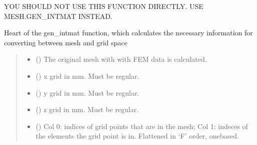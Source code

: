 \documentclass[letterpaper,10pt,english]{sphinxmanual}
\begin{document}
\begin{fulllineitems}
\label{\detokenize{_autosummary/nirfasterff.utils.gen_intmat_impl:nirfasterff.utils.gen_intmat_impl}}
\pysigstartsignatures
{}
\pysigstopsignatures
\sphinxAtStartPar
YOU SHOULD NOT USE THIS FUNCTION DIRECTLY. USE MESH.GEN\_INTMAT INSTEAD.

\sphinxAtStartPar
Heart of the gen\_intmat function, which calculates the necessary information for converting between mesh and grid space
\begin{quote}\begin{description}
\begin{itemize}
\item {} 
\sphinxAtStartPar
{} () \textendash{} The original mesh with with FEM data is calculated.

\item {} 
\sphinxAtStartPar
{} () \textendash{} x grid in mm. Must be regular.

\item {} 
\sphinxAtStartPar
{} () \textendash{} y grid in mm. Must be regular.

\item {} 
\sphinxAtStartPar
{} (\sphinxstyleliteralemphasis{\sphinxupquote{{[}}}\sphinxstyleliteralemphasis{\sphinxupquote{{]} }}) \textendash{} z grid in mm. Must be regular.

\end{itemize}

\sphinxAtStartPar
\begin{itemize}
\item {} 
\sphinxAtStartPar
{} () \textendash{} Col 0: indices of grid points that are in the mesh; Col 1: indeces of the elements the grid point is in. Flattened in ‘F’ order, one\sphinxhyphen{}based.


\end{itemize}
\end{description}
\end{quote}
\end{fulllineitems}
\end{document}
